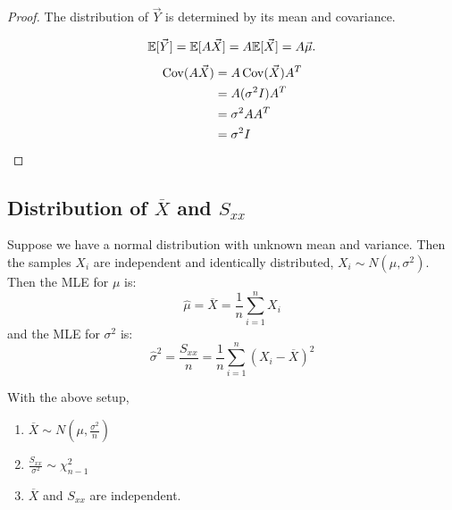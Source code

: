 \documentclass[../Main.tex]{subfiles}
\begin{document}
\begin{proof}
    The distribution of $\vec{Y}$ is determined by its mean and covariance.

    \begin{equation*}
        \mathbb{E}[\vec{Y}] = \mathbb{E}[A\vec{X}] = A\mathbb{E}[\vec{X}] = A\vec{\mu}.
    \end{equation*}
    \begin{align*}
        \operatorname{Cov}(A\vec{X}) &= A\operatorname{Cov}(\vec{X})A^T \\
        &= A(\sigma^2 I)A^T \\
        &= \sigma^2 AA^T \\
        &= \sigma^2 I
    \end{align*}
\end{proof}
\subsection{Distribution of \texorpdfstring{$\overline{X}$}{X-bar} and \texorpdfstring{$S_{xx}$}{Sxx}}
Suppose we have a normal distribution with unknown mean and variance. Then the samples $X_i$ are independent and identically distributed, $X_i \sim N(\mu, \sigma^2)$. Then the MLE for $\mu$ is:
\begin{equation*}
    \hat{\mu} = \overline{X} = \frac1n \sum_{i=1}^{n} X_i
\end{equation*}
and the MLE for $\sigma^2$ is:
\begin{equation*}
    \hat{\sigma}^2 = \frac{S_{xx}}{n} = \frac1n \sum_{i=1}^{n} (X_i - \overline{X})^2
\end{equation*}
\begin{theorem}
    With the above setup,
    \begin{enumerate}
        \item $\overline{X} \sim N\left(\mu, \frac{\sigma^2}{n}\right)$
        \item $\frac{S_{xx}}{\sigma^2} \sim \chi_{n-1}^2$
        \item $\overline{X}$ and $S_{xx}$ are independent.
    \end{enumerate}
    \label{thmNormalStatistics}
\end{theorem}
\end{document}

